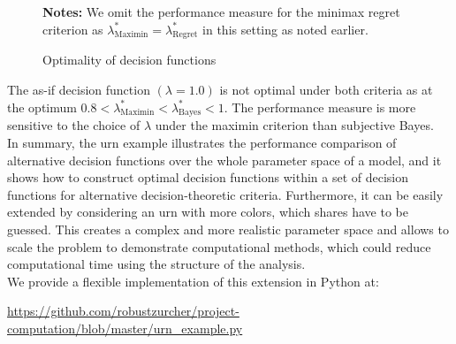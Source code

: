 \begin{figure}[h!]\centering
{}\vspace{-0.9cm}
\begin{center}
\begin{minipage}[t]{0.5\columnwidth}
\item \scriptsize{\textbf{Notes:} We omit the performance measure for the minimax regret criterion as $\lambda^*_{\text{Maximin}} = \lambda^*_{\text{Regret}}$ in this setting as noted earlier.}
\end{minipage}
\end{center}
\caption{Optimality of decision functions}\label{Optimality of decision functions for urn}
\end{figure}\FloatBarrier

The as-if decision function $(\lambda=1.0)$ is not optimal under both criteria as at the optimum  $0.8 < \lambda^*_{\text{Maximin}} < \lambda^*_{\text{Bayes}} < 1$. The performance measure is more sensitive to the choice of $\lambda$ under the maximin criterion than subjective Bayes.\\

In summary, the urn example illustrates the performance comparison of alternative decision functions over the whole parameter space of a model, and it shows how to construct optimal decision functions within a set of decision functions for alternative decision-theoretic criteria. Furthermore, it can be easily extended by considering an urn with more colors, which shares have to be guessed. This creates a complex and more realistic parameter space and allows to scale the problem to demonstrate computational methods, which could reduce computational time using the structure of the analysis.\\

We provide a flexible implementation of this extension in Python at:

\begin{center}
\href{https://github.com/robustzurcher/project-computation/blob/master/implementation.py}{https://github.com/robustzurcher/project-computation/blob/master/urn\_example.py}
\end{center}
